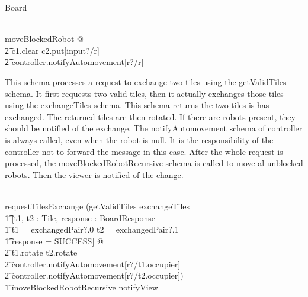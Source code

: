 \documentclass[12pt]{article}
\begin{document}
\begin{class}{Board}
\begin{zpar}
\end{zpar} \\
moveBlockedRobot \sdef [c1, c2 : \dom tiles, r : \dom robots, \\ \t1 response : BoardResponse | \\ \t1 tiles(c1) \in ConveyorTile \wedge tiles(c1).occupier = r \; \; \wedge \\ \t1 conveyorDest(c1) \not = c1 \wedge conveyorDest(c1) = c2 \; \; \wedge \\ \t1
(\IF tiles(c2) \in HomeTile \wedge tiles(c2).target = r \\ \t1
\THEN response = WIN \\ \t1
\ELSE response = SUCCESS)] @ \\ \t2 c1.clear \wedge c2.put[input?/r] \; \; \wedge \\ \t2 controller.notifyAutomovement[r?/r] \\
\also \also \also
\begin{zpar}
This schema processes a request to exchange two tiles using the getValidTiles schema. It first requests two valid tiles, then it actually exchanges those tiles using the exchangeTiles schema.
This schema returns the two tiles is has exchanged. The returned tiles are then rotated. If there are robots present, they should
be notified of the exchange. The notifyAutomovement schema of controller is always called, even when the robot is null. It is the responsibility of the controller not to forward the message in this case.
After the whole request is processed, the moveBlockedRobotRecursive schema is called to move al unblocked robots. Then the viewer is notified of the change.
\end{zpar} \\
requestTilesExchange \sdef (getValidTiles \comp exchangeTiles \; \; \comp \\
\t1 [t1, t2 : Tile, response : BoardResponse | \\ \t1 t1 = exchangedPair?.0 \wedge t2 = exchangedPair?.1 \; \; \wedge \\ \t1 response = SUCCESS] @ \\ \t2 t1.rotate \wedge t2.rotate \; \; \wedge \\ \t2 controller.notifyAutomovement[r?/t1.occupier] \; \; \wedge \\ \t2 controller.notifyAutomovement[r?/t2.occupier]) \; \; \comp \\ \t1 moveBlockedRobotRecursive \comp notifyView \\
\znewpage
\begin{zpar}

\end{zpar}
\end{class}
\end{document}
